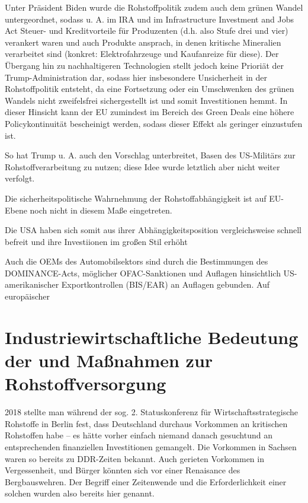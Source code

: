 \documentclass[12pt,a4paper,oneside]{book} %
\begin{document}
Unter Präsident Biden wurde die Rohstoffpolitik zudem auch dem grünen Wandel untergeordnet, sodass u. A. im IRA und im Infrastructure Investment and Jobs Act Steuer- und Kreditvorteile für Produzenten (d.h. also Stufe drei und vier) verankert waren und auch Produkte ansprach, in denen kritische Mineralien verarbeitet sind (konkret: Elektrofahrzeuge und Kaufanreize für diese). Der Übergang hin zu nachhaltigeren Technologien stellt jedoch keine Prioriät der Trump-Administration dar, sodass hier insbesondere Unsicherheit in der Rohstoffpolitik entsteht, da eine Fortsetzung oder ein Umschwenken des grünen Wandels nicht zweifelsfrei sichergestellt ist und somit Investitionen hemmt. In dieser Hinsicht kann der EU zumindest im Bereich des Green Deals eine höhere Policykontinuität bescheinigt werden, sodass dieser Effekt als geringer einzustufen ist.



So hat Trump u. A. auch den Vorschlag unterbreitet, Basen des US-Militärs zur Rohstoffverarbeitung zu nutzen; diese Idee wurde letztlich aber nicht weiter verfolgt.

Die sicherheitspolitische Wahrnehmung der Rohstoffabhängigkeit ist auf EU-Ebene noch nicht in diesem Maße eingetreten.

Die USA haben sich somit aus ihrer Abhängigkeitsposition vergleichsweise schnell befreit und ihre Investiionen im großen Stil erhöht

Auch die OEMs des Automobilsektors sind durch die Bestimmungen des DOMINANCE-Acts, möglicher OFAC-Sanktionen und Auflagen hinsichtlich US-amerikanischer Exportkontrollen (BIS/EAR) an Auflagen gebunden. Auf europäischer 


\section{Industriewirtschaftliche Bedeutung der und Maßnahmen zur Rohstoffversorgung}


2018 stellte man während der sog. 2. Statuskonferenz für Wirtschaftsstrategische Rohstoffe in Berlin fest, dass Deutschland durchaus Vorkommen an kritischen Rohstoffen habe -- es hätte vorher \glqq einfach niemand danach gesucht\grqq und an entsprechenden finanziellen Investitionen gemangelt.\autocite{VDINachrichten: Rohstoffe: Deutschland ist reich an seltenen Erden} Die Vorkommen in Sachsen waren so bereits zu DDR-Zeiten bekannt. Auch gerieten Vorkommen in Vergessenheit, und Bürger könnten sich vor einer \glqq Renaisance des Bergbaus\grqq wehren. Der Begriff einer Zeitenwende und die Erforderlichkeit einer solchen wurden also bereits hier genannt.
\end{document}
